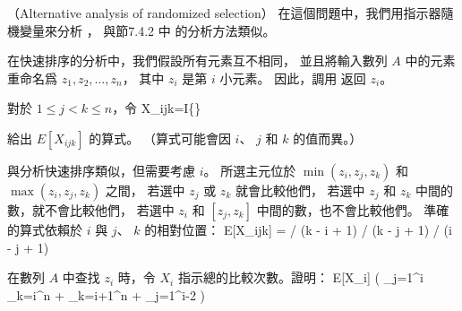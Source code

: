\startPROBLEM
（Alternative analysis of randomized selection）
在這個問題中，我們用指示器隨機變量來分析 ，
與節7.4.2 中  的分析方法類似。

在快速排序的分析中，我們假設所有元素互不相同，
並且將輸入數列 $A$ 中的元素重命名爲 $z_1,z_2,\ldots,z_n$，
其中 $z_i$ 是第 $i$ 小元素。
因此，調用  返回 $z_i$。

對於 $1\le j < k \le n$，令
\startformula
X_{ijk}=I\{\}
\stopformula

\startigBase[a]\startitem
給出 $E[X_{ijk}]$ 的算式。
（\hint 算式可能會因 $i$、 $j$ 和 $k$ 的值而異。）
\stopitem\stopigBase

\startANSWER
與分析快速排序類似，但需要考慮 $i$。
所選主元位於 $\min(z_i,z_j,z_k)$ 和 $\max(z_i,z_j,z_k)$ 之間，
若選中 $z_j$ 或 $z_k$ 就會比較他們，
若選中 $z_j$ 和 $z_k$ 中間的數，就不會比較他們，
若選中 $z_i$ 和 $[z_j,z_k]$ 中間的數，也不會比較他們。
準確的算式依賴於 $i$ 與 $j$、 $k$ 的相對位置：
\startformula
E[X_{ijk}] = \startmathcases
{} / (k - i + 1) \NC {} \NR
{} / (k - j + 1) \NC {} \NR
{} / (i - j + 1) \NC {} \NR
\stopmathcases
\stopformula
\stopANSWER

\startigBase[continue]\startitem
在數列 $A$ 中查找 $z_i$ 時，令 $X_i$ 指示總的比較次數。證明：
\startformula
E[X_i]  \left(
       \sum_{j=1}^i \sum_{k=i}^n  +
       \sum_{k=i+1}^n  +
       \sum_{j=1}^{i-2} 
       \right)
\stopformula
\stopitem\stopigBase

